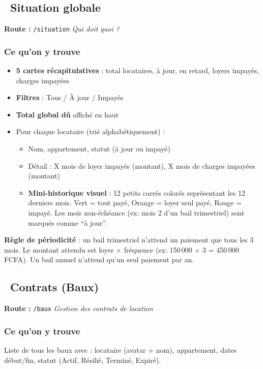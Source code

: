 \documentclass[12pt,a4paper]{article}
\begin{document}
\subsection{\faClipboardList\ Situation globale}
\textbf{Route :} \texttt{/situation} \hfill \textit{Qui doit quoi ?}

\subsubsection{Ce qu'on y trouve}
\begin{itemize}
\item \textbf{5 cartes r\'ecapitulatives} : total locataires, \`a jour, en retard, loyers impay\'es, charges impay\'ees
\item \textbf{Filtres} : Tous / \`A jour / Impay\'es
\item \textbf{Total global d\^u} affich\'e en haut
\item Pour chaque locataire (tri\'e alphab\'etiquement) :
  \begin{itemize}
  \item Nom, appartement, statut (\`a jour ou impay\'e)
  \item D\'etail : X mois de loyer impay\'es (montant), X mois de charges impay\'ees (montant)
  \item \textbf{Mini-historique visuel} : 12 petits carr\'es color\'es repr\'esentant les 12 derniers mois. \textcolor{vertOk}{Vert} = tout pay\'e, \textcolor{orangeWarn}{Orange} = loyer seul pay\'e, \textcolor{rougeAlert}{Rouge} = impay\'e. Les mois non-\'ech\'eance (ex: mois 2 d'un bail trimestriel) sont marqu\'es comme ``\`a jour''.
  \end{itemize}
\end{itemize}

\begin{warnbox}
\textbf{R\`egle de p\'eriodicit\'e} : un bail trimestriel n'attend un paiement que tous les 3 mois. Le montant attendu est loyer $\times$ fr\'equence (ex: 150\,000 $\times$ 3 = 450\,000 FCFA). Un bail annuel n'attend qu'un seul paiement par an.
\end{warnbox}


\subsection{\faFileContract\ Contrats (Baux)}
\textbf{Route :} \texttt{/baux} \hfill \textit{Gestion des contrats de location}

\subsubsection{Ce qu'on y trouve}
Liste de tous les baux avec : locataire (avatar + nom), appartement, dates d\'ebut/fin, statut (Actif, R\'esili\'e, Termin\'e, Expir\'e).
\end{document}

